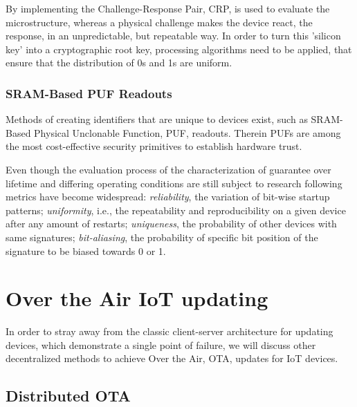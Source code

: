 By implementing the Challenge-Response Pair, CRP, is used to evaluate the microstructure, whereas a physical challenge
makes the device react, the response, in an unpredictable, but repeatable way.
In order to turn this 'silicon key' into a cryptographic root key, processing algorithms need to be applied, that ensure
that the distribution of 0s and 1s are uniform. \cite{herder2014physical}

\subsubsection{SRAM-Based PUF Readouts} %
\label{sec:SRAM-Based PUF Readouts}

Methods of creating identifiers that are unique to devices exist, such as SRAM-Based Physical Unclonable Function, PUF,
readouts. Therein PUFs are among the most cost-effective security primitives to establish hardware trust.
\cite{holcomb2007initial}

Even though the evaluation process of the characterization of guarantee over lifetime and differing operating conditions
are still subject to research following metrics have become widespread: \textit{reliability}, the variation of bit-wise
startup patterns; \textit{uniformity}, i.e., the repeatability and reproducibility on a given device after any amount of
restarts; \textit{uniqueness}, the probability of other devices with same signatures; \textit{bit-aliasing}, the
probability of specific bit position of the signature to be biased towards 0 or 1. \cite{vinagrero2023sram}


\section{Over the Air IoT updating} %
\label{sec:Over the Air  IoT updating}
In order to stray away from the classic client-server architecture for updating devices, which demonstrate a single
point of failure, we will discuss other decentralized methods to achieve Over the Air, OTA, updates for IoT devices.

\subsection{Distributed OTA} %
\label{sub:Distributed OTA}


